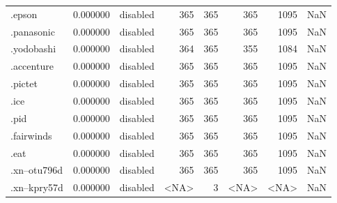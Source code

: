 \begin{tabular}{lrlrrrrl}
.epson                    &          0.000000 &        disabled &                         365 &                         365 &                         365 &                1095 &                  NaN \\
.panasonic                &          0.000000 &        disabled &                         365 &                         365 &                         365 &                1095 &                  NaN \\
.yodobashi                &          0.000000 &        disabled &                         364 &                         365 &                         355 &                1084 &                  NaN \\
.accenture                &          0.000000 &        disabled &                         365 &                         365 &                         365 &                1095 &                  NaN \\
.pictet                   &          0.000000 &        disabled &                         365 &                         365 &                         365 &                1095 &                  NaN \\
.ice                      &          0.000000 &        disabled &                         365 &                         365 &                         365 &                1095 &                  NaN \\
.pid                      &          0.000000 &        disabled &                         365 &                         365 &                         365 &                1095 &                  NaN \\
.fairwinds                &          0.000000 &        disabled &                         365 &                         365 &                         365 &                1095 &                  NaN \\
.eat                      &          0.000000 &        disabled &                         365 &                         365 &                         365 &                1095 &                  NaN \\
.xn--otu796d              &          0.000000 &        disabled &                         365 &                         365 &                         365 &                1095 &                  NaN \\
.xn--kpry57d              &          0.000000 &        disabled &                        <NA> &                           3 &                        <NA> &                <NA> &                  NaN \\

\end{tabular}
